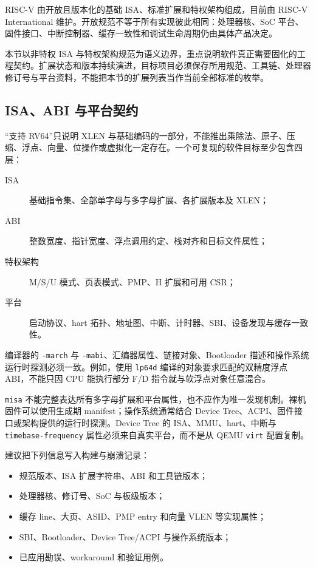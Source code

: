 RISC-V 由开放且版本化的基础 ISA、标准扩展和特权架构组成，目前由 RISC-V International 维护。开放规范不等于所有实现彼此相同：处理器核、SoC 平台、固件接口、中断控制器、缓存一致性和调试生命周期仍由具体产品决定。

本节以非特权 ISA 与特权架构规范为语义边界\cite{riscvspec,riscvpri}，重点说明软件真正需要固化的工程契约。扩展状态和版本持续演进，目标项目必须保存所用规范、工具链、处理器修订号与平台资料，不能把本节的扩展列表当作当前全部标准的枚举。

\subsection{ISA、ABI 与平台契约}

“支持 RV64”只说明 XLEN 与基础编码的一部分，不能推出乘除法、原子、压缩、浮点、向量、位操作或虚拟化一定存在。一个可复现的软件目标至少包含四层：
\begin{description}
  \item[ISA] 基础指令集、全部单字母与多字母扩展、各扩展版本及 XLEN；
  \item[ABI] 整数宽度、指针宽度、浮点调用约定、栈对齐和目标文件属性；
  \item[特权架构] M/S/U 模式、页表模式、PMP、H 扩展和可用 CSR；
  \item[平台] 启动协议、hart 拓扑、地址图、中断、计时器、SBI、设备发现与缓存一致性。
\end{description}

编译器的 \texttt{-march} 与 \texttt{-mabi}、汇编器属性、链接对象、Bootloader 描述和操作系统运行时探测必须一致。例如，使用 \texttt{lp64d} 编译的对象要求匹配的双精度浮点 ABI，不能只因 CPU 能执行部分 F/D 指令就与软浮点对象任意混合。

\texttt{misa} 不能完整表达所有多字母扩展和平台属性，也不应作为唯一发现机制。裸机固件可以使用生成期 manifest；操作系统通常结合 Device Tree、ACPI、固件接口或架构提供的运行时探测。Device Tree 的 ISA、MMU、hart、中断与 \texttt{timebase-frequency} 属性必须来自真实平台，而不是从 QEMU \texttt{virt} 配置复制\cite{devicetree-spec,qemu-riscv}。

建议把下列信息写入构建与崩溃记录：
\begin{itemize}
  \item 规范版本、ISA 扩展字符串、ABI 和工具链版本；
  \item 处理器核、修订号、SoC 与板级版本；
  \item 缓存 line、大页、ASID、PMP entry 和向量 VLEN 等实现属性；
  \item SBI、Bootloader、Device Tree/ACPI 与操作系统版本；
  \item 已应用勘误、workaround 和验证用例。
\end{itemize}

